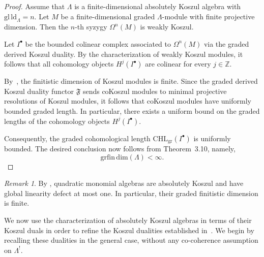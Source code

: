 \documentclass[11pt]{article}
\theoremstyle{definition}
\theoremstyle{remark}
\newtheorem{remark}[theorem]{Remark}
\begin{document}
\begin{proof}
Assume that \(\Lambda\) is a finite-dimensional absolutely Koszul algebra with \(\mathrm{gl\,ld}_{\Lambda}=n\). Let \(M\) be a finite-dimensional graded \(\Lambda\)-module with finite projective dimension. Then the \(n\)-th syzygy \(\Omega^{n}(M)\) is weakly Koszul.

Let \(I^{\bullet}\) be the bounded colinear complex associated to \(\Omega^{n}(M)\) via the graded derived Koszul duality. By the characterization of weakly Koszul modules, it follows that all cohomology objects \(H^{j}(I^{\bullet})\) are colinear for every \(j\in\mathbb{Z}\).

By~\cite[Theorem~4.5]{12}, the finitistic dimension of Koszul modules is finite. Since the graded derived Koszul duality functor \(\mathfrak{F}\) sends coKoszul modules to minimal projective resolutions of Koszul modules, it follows that coKoszul modules have uniformly bounded graded length. In particular, there exists a uniform bound on the graded lengths of the cohomology objects \(H^{j}(I^{\bullet})\).

Consequently, the graded cohomological length \(\mathrm{CHL}_{\mathrm{gr}}(I^{\bullet})\) is uniformly bounded. The desired conclusion now follows from Theorem~3.10, namely,
\[
\mathrm{grfin\,dim}(\Lambda)<\infty.
\]
\end{proof}
\begin{remark}
By \cite{5}, quadratic monomial algebras are absolutely Koszul and have global linearity defect at most one. In particular, their graded finitistic dimension is finite.
\end{remark}
We now use the characterization of absolutely Koszul algebras in terms of their Koszul duals in order to refine the Koszul dualities established in~\cite{4}. We begin by recalling these dualities in the general case, without any co-coherence assumption on \(\Lambda^{!}\).
\end{document}
